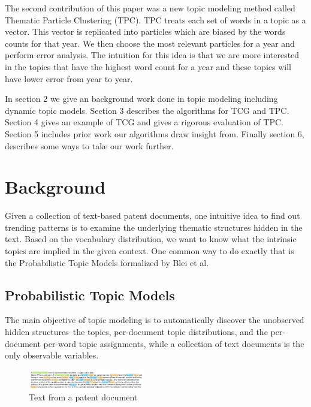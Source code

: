 \documentclass[conference]{IEEEtran}
\begin{document}
The second contribution of this paper was a new topic modeling method called Thematic Particle Clustering (TPC). TPC treats each set of words in a topic as a vector. This vector is replicated into particles which are biased by the words counts for that year. We then choose the most relevant particles for a year and perform error analysis. The intuition for this idea is that we are more interested in the topics that have the highest word count for a year and these topics will have lower error from year to year.

In section 2 we give an background work done in topic modeling including dynamic topic models. Section 3 describes the algorithms for TCG and TPC. Section 4 gives an example of  TCG and gives a rigorous evaluation of TPC. Section 5 includes prior work our algorithms draw insight from. Finally section 6, describes some ways to take our work further.

\section{Background}

Given a collection of text-based patent documents, one intuitive idea to find out trending patterns is to examine the underlying thematic structures hidden in the text. Based on the vocabulary distribution, we want to know what the intrinsic topics are implied in the given context. One common way to do exactly that is the Probabilistic Topic Models formalized by  Blei et al. \cite{blei2011}

\subsection{Probabilistic Topic Models}

The main objective of topic modeling is to automatically discover the unobserved hidden structures--the topics, per-document topic distributions, and the per-document per-word topic assignments, while a collection of text documents is the only observable variables. 

\begin{figure}[h]
    \center    
	\includegraphics[width=0.45\textwidth]{fig/pat007.png}
	\caption{Text from a patent document}
	\label{sample_patent}
\end{figure}
\end{document}
